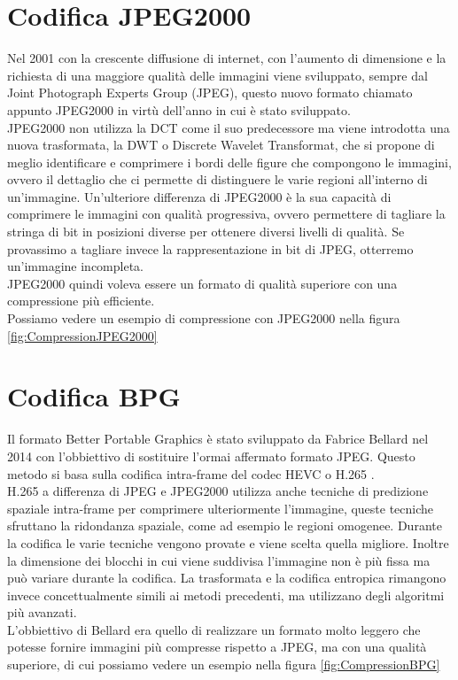 \section{Codifica JPEG2000}
Nel 2001 con la crescente diffusione di internet, con l’aumento di dimensione e la richiesta di una maggiore qualità delle immagini viene sviluppato, sempre dal Joint Photograph Experts Group (JPEG), questo nuovo formato chiamato appunto JPEG2000 in virtù dell'anno in cui è stato sviluppato.\\
JPEG2000 non utilizza la DCT come il suo predecessore ma viene introdotta una nuova trasformata, la DWT o Discrete Wavelet Transformat, che si propone di meglio identificare e comprimere i bordi delle figure che compongono le immagini, ovvero il dettaglio che ci permette di distinguere le varie regioni all'interno di un’immagine.
Un’ulteriore differenza di JPEG2000 è la sua capacità di comprimere le immagini con qualità progressiva, ovvero permettere di tagliare la stringa di bit in posizioni diverse per ottenere diversi livelli di qualità. Se provassimo a tagliare invece la rappresentazione in bit di JPEG, otterremo un’immagine incompleta.\\
JPEG2000 quindi voleva essere un formato di qualità superiore con una compressione più efficiente.\cite{952804}\\
Possiamo vedere un esempio di compressione con JPEG2000 nella figura \ref{fig:CompressionJPEG2000}

\section{Codifica BPG}
Il formato Better Portable Graphics è stato sviluppato da Fabrice Bellard nel 2014 con l'obbiettivo di sostituire l’ormai affermato formato JPEG. Questo metodo si basa sulla codifica intra-frame del codec HEVC o H.265 \cite{BPGImageformat}.\\
H.265 a differenza di JPEG e JPEG2000 utilizza anche tecniche di predizione spaziale intra-frame per comprimere ulteriormente l’immagine, queste tecniche sfruttano la ridondanza spaziale, come ad esempio le regioni omogenee. Durante la codifica le varie tecniche vengono provate e viene scelta quella migliore. Inoltre la dimensione dei blocchi in cui viene suddivisa l’immagine non è più fissa ma può variare durante la codifica.
La trasformata e la codifica entropica rimangono invece concettualmente simili ai metodi precedenti, ma utilizzano degli algoritmi più avanzati.\\
L’obbiettivo di  Bellard era quello di realizzare un formato molto leggero che potesse fornire immagini più compresse rispetto a JPEG, ma con una qualità superiore, di cui possiamo vedere un esempio nella figura \ref{fig:CompressionBPG}

